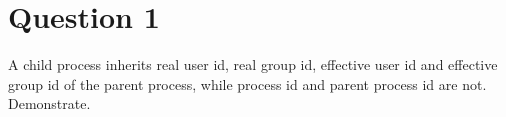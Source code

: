 \documentclass[main.tex]{subfiles}
\begin{document}
\section{Question 1}
A child process inherits real user id, real group id, effective user id and
effective group id of the parent process, while process id and parent process id
are not. Demonstrate.




\end{document}

